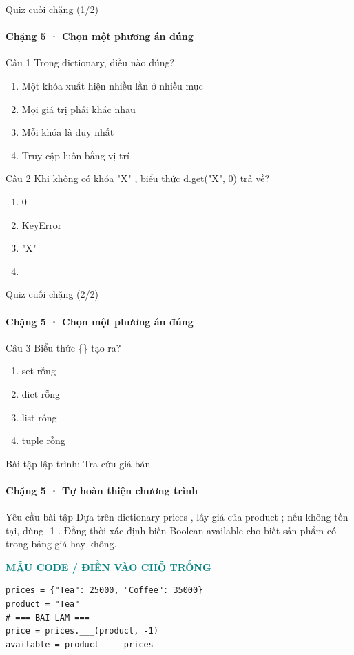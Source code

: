 \documentclass[aspectratio=169,10pt]{beamer}
\begin{document}
\begin{frame}[t]{Quiz cuối chặng (1/2)}
\framesubtitle{Chặng 5 · Chọn một phương án đúng}
\small
\begin{block}{Câu 1}
Trong dictionary, điều nào đúng?\par\smallskip
\begin{enumerate}
\item Một khóa xuất hiện nhiều lần ở nhiều mục
\item Mọi giá trị phải khác nhau
\item Mỗi khóa là duy nhất
\item Truy cập luôn bằng vị trí
\end{enumerate}
\end{block}
\begin{block}{Câu 2}
Khi không có khóa "X" , biểu thức d.get("X", 0) trả về?\par\smallskip
\begin{enumerate}
\item 0
\item KeyError
\item "X"
\item []
\end{enumerate}
\end{block}

\end{frame}

\begin{frame}[t]{Quiz cuối chặng (2/2)}
\framesubtitle{Chặng 5 · Chọn một phương án đúng}
\small
\begin{block}{Câu 3}
Biểu thức \{\} tạo ra?\par\smallskip
\begin{enumerate}
\item set rỗng
\item dict rỗng
\item list rỗng
\item tuple rỗng
\end{enumerate}
\end{block}

\end{frame}

\begin{frame}[fragile,t]{Bài tập lập trình: Tra cứu giá bán}
\framesubtitle{Chặng 5 · Tự hoàn thiện chương trình}
\begin{block}{Yêu cầu bài tập}
Dựa trên dictionary prices , lấy giá của product ; nếu không tồn tại, dùng -1 . Đồng thời xác định biến Boolean available cho biết sản phẩm có trong bảng giá hay không.
\end{block}
\textcolor{teal}{\scriptsize\textbf{MẪU CODE / ĐIỀN VÀO CHỖ TRỐNG}}\par
\begin{Verbatim}[fontsize=\scriptsize,frame=single,framesep=3mm,rulecolor=\color{teal!35},breaklines=true]
prices = {"Tea": 25000, "Coffee": 35000}
product = "Tea"
# === BAI LAM ===
price = prices.___(product, -1)
available = product ___ prices
\end{Verbatim}
\end{frame}
\end{document}
